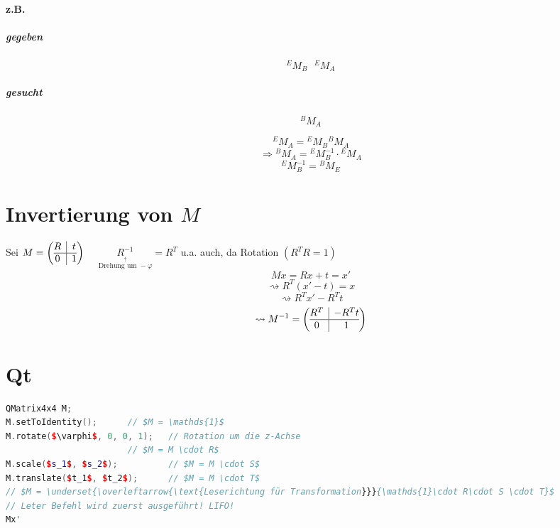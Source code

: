 \paragraph{z.B.}
\subparagraph{gegeben}
\[ {}^EM_B~~~{}^EM_A \]
\subparagraph{gesucht}
\[ {}^BM_A \]

\[ {}^EM_A = {}^EM_B{}^BM_A \]
\[ \Rightarrow {}^BM_A = {}^EM_B^{-1}\cdot{}^EM_A \]
\[ {}^EM_B^{-1} = {}^BM_E \]
\section{Invertierung von $M$}
Sei $M = \left( \begin{array}{@{}c|c@{}}
R&t\\ \hline 0 & 1
\end{array} \right)$ $ ~~~~~\underset{\overset{\uparrow}{\text{Drehung um }-\varphi}}{R^{-1}} = R^T$ u.a. auch, da Rotation $(R^TR = 1)$ %
\[ Mx = Rx + t = x' \]
\[ \rightsquigarrow R^T (x'-t) = x \]
\[ \rightsquigarrow R^Tx' - R^Tt \]
\[ \rightsquigarrow M^{-1} = \left( \begin{array}{@{}c|c@{}}
R^T&-R^Tt\\ \hline 0 & 1
\end{array} \right) \]
\section{Qt}
\begin{lstlisting}[language=c++]
QMatrix4x4 M;
M.setToIdentity();		// $M = \mathds{1}$
M.rotate($\varphi$, 0, 0, 1);	// Rotation um die z-Achse
						// $M = M \cdot R$
M.scale($s_1$, $s_2$);			// $M = M \cdot S$
M.translate($t_1$, $t_2$);		// $M = M \cdot T$
// $M = \underset{\overleftarrow{\text{Leserichtung für Transformation}}}{\mathds{1}\cdot R\cdot S \cdot T}$
// Leter Befehl wird zuerst ausgeführt! LIFO!
Mx'
\end{lstlisting}